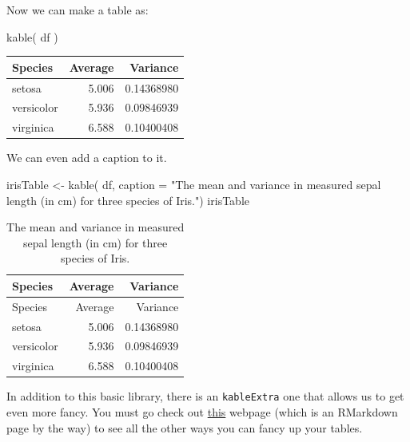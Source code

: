 \documentclass[
  letterpaper,
]{book}
\newenvironment{Shaded}{\begin{snugshade}}{\end{snugshade}}
\newcommand{\AttributeTok}[1]{\textcolor[rgb]{0.40,0.45,0.13}{#1}}
\newcommand{\FunctionTok}[1]{\textcolor[rgb]{0.28,0.35,0.67}{#1}}
\newcommand{\NormalTok}[1]{\textcolor[rgb]{0.00,0.23,0.31}{#1}}
\newcommand{\OtherTok}[1]{\textcolor[rgb]{0.00,0.23,0.31}{#1}}
\newcommand{\StringTok}[1]{\textcolor[rgb]{0.13,0.47,0.30}{#1}}
\newcounter{none} %
\begin{document}
Now we can make a table as:

\begin{Shaded}
\begin{Highlighting}[]
\FunctionTok{kable}\NormalTok{( df )}
\end{Highlighting}
\end{Shaded}

{\def\LTcaptype{none} %
\begin{longtable}[]{@{}lrr@{}}
\toprule\noalign{}
Species & Average & Variance \\
\midrule\noalign{}
\endhead
\bottomrule\noalign{}
\endlastfoot
setosa & 5.006 & 0.14368980 \\
versicolor & 5.936 & 0.09846939 \\
virginica & 6.588 & 0.10400408 \\
\end{longtable}
}

We can even add a caption to it.

\begin{Shaded}
\begin{Highlighting}[]
\NormalTok{irisTable }\OtherTok{\textless{}{-}} \FunctionTok{kable}\NormalTok{( df, }\AttributeTok{caption =} \StringTok{"The mean and variance in measured sepal length (in cm) for three species of Iris."}\NormalTok{)}
\NormalTok{irisTable}
\end{Highlighting}
\end{Shaded}

\begin{longtable}[]{@{}lrr@{}}
\caption{The mean and variance in measured sepal length (in cm) for
three species of Iris.}\tabularnewline
\toprule\noalign{}
Species & Average & Variance \\
\midrule\noalign{}
\endfirsthead
\toprule\noalign{}
Species & Average & Variance \\
\midrule\noalign{}
\endhead
\bottomrule\noalign{}
\endlastfoot
setosa & 5.006 & 0.14368980 \\
versicolor & 5.936 & 0.09846939 \\
virginica & 6.588 & 0.10400408 \\
\end{longtable}

In addition to this basic library, there is an \texttt{kableExtra} one
that allows us to get even more fancy. You must go check out
\href{https://cran.r-project.org/web/packages/kableExtra/vignettes/awesome_table_in_html.html}{this}
webpage (which is an RMarkdown page by the way) to see all the other
ways you can fancy up your tables.
\end{document}
